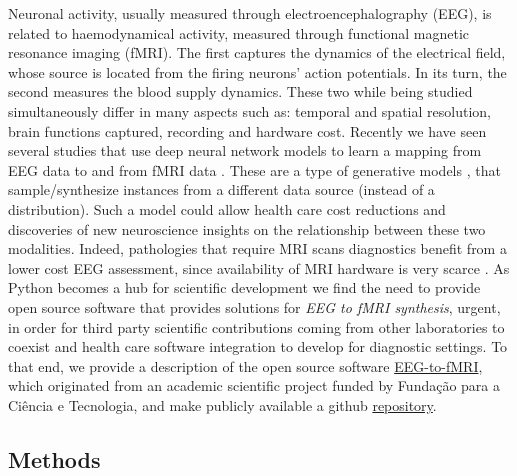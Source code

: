 Neuronal activity, usually measured through electroencephalography (EEG), is related to haemodynamical activity, measured through functional magnetic resonance imaging (fMRI). The first captures the dynamics of the electrical field, whose source is located from the firing neurons' action potentials. In its turn, the second measures the blood supply dynamics. These two while being studied simultaneously \cite{shibasaki2008human,yu2016building,he2018spatialtemporaldo,rojas2018study,brechet2019capturing,daly2019electroencephalography,cury2020sparse,abreu2021eeg} differ in many aspects such as: temporal and spatial resolution, brain functions captured, recording and hardware cost. Recently we have seen several studies that use deep neural network models \cite{goodfellow2016deep} to learn a mapping from EEG data to and from fMRI data \cite{liu2019convolutional, calhas2022eeg}. These are a type of generative models \cite{murphy2012machine}, that sample/synthesize instances from a different data source (instead of a distribution). Such a model could allow health care cost reductions and discoveries of new neuroscience insights on the relationship between these two modalities. Indeed, pathologies that require MRI scans diagnostics benefit from a lower cost EEG assessment, since availability of MRI hardware is very scarce \cite{ogbole2018survey}. As Python \cite{van1995python} becomes a hub for scientific development \cite{harris2020array,virtanen2020scipy,abadi2016tensorflow} we find the need to provide open source software that provides solutions for \textit{EEG to fMRI synthesis}, urgent, in order for third party scientific contributions coming from other laboratories to coexist and health care software integration to develop for diagnostic settings. To that end, we provide a description of the open source software \href{https://pypi.org/project/eeg-to-fmri/}{EEG-to-fMRI}, which originated from an academic scientific project funded by Funda\c{c}\~{a}o para a Ci\^{e}ncia e Tecnologia, and make publicly available a github \href{https://github.com/eeg-to-fmri/eeg-to-fmri}{repository}.

\subsection{Methods}\label{section:methods}

